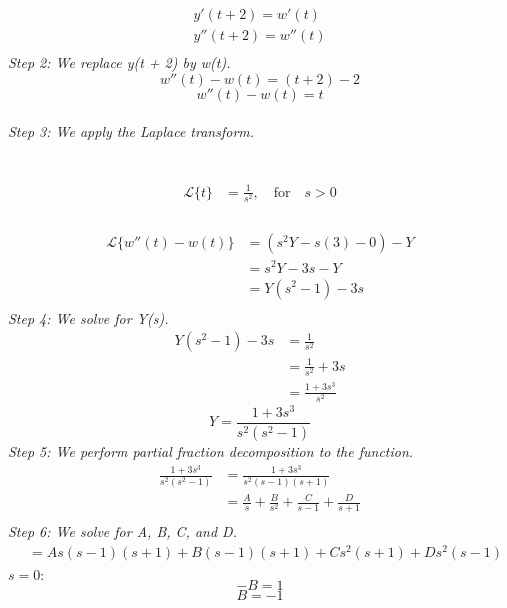 \documentclass{article}
\begin{document}
     \begin{align*}
        y'(t + 2) = w'(t) \\
        y''(t + 2) = w''(t) \\
     \end{align*}
    \textit{Step 2: We replace y(t + 2) by w(t).} \\
    $$w''(t) - w(t) = (t + 2) - 2$$
    $$w''(t) - w(t) = t$$ \\
    \textit{Step 3: We apply the Laplace transform.} \\ \\
     \\
    \begin{align*}
        \mathcal{L}\{t\} &= \frac{1}{s^{2}}, \quad \text{for}  \quad s > 0 \\
    \end{align*}
     \\
    \begin{align*}
        \mathcal{L}\{w''(t) - w(t)\} &= (s^{2}Y -s(3) - 0) - Y \\
        &= s^{2}Y - 3s - Y \\
        &= Y(s^{2} - 1) - 3s \\
    \end{align*}
    \textit{Step 4: We solve for Y(s).} \\
    \begin{align*}
        Y(s^{2} - 1) - 3s &= \frac{1}{s^{2}} \\
        &= \frac{1}{s^{2}} + 3s \\
        &= \frac{1 + 3s^{3}}{s^{2}}
    \end{align*}
    $$Y = \frac{1 + 3s^{3}}{s^{2}(s^{2} - 1)}$$
\textit{Step 5: We perform partial fraction decomposition to the function.} \\
\begin{align*}
    \frac{1 + 3s^{3}}{s^{2}(s^{2} - 1)} &= \frac{1 + 3s^{3}}{s^{2}(s -1)(s + 1)}\\
    &= \frac{A}{s} + \frac{B}{s^{2}} + \frac{C}{s - 1} + \frac{D}{s + 1} \\
\end{align*}
\textit{Step 6: We solve for A, B, C, and D.} \\
\begin{align*}
    &= As(s - 1)(s + 1) + B(s - 1)(s + 1) + Cs^{2}(s + 1) + Ds^{2}(s - 1) \\
\end{align*}
    $s = 0:$
    $$-B = 1$$
    $$B = -1$$
\end{document}
